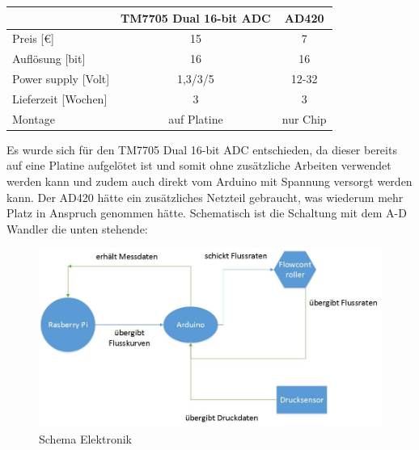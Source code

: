 \begin{center}
\begin{tabular}{l|c|c}
	& TM7705 Dual 16-bit ADC & AD420 \\ 
	\hline Preis [\euro]	& 15  & 7 \\ 
	\hline Auflösung [bit]	& 16  & 16 \\ 
	\hline Power supply [Volt]	& 1,3/3/5  & 12-32 \\ 
	\hline Lieferzeit [Wochen]	& 3  & 3 \\ 
	\hline Montage 	& auf Platine  & nur Chip \\ 
\end{tabular} 	
\end{center}


Es wurde sich für den TM7705 Dual 16-bit ADC entschieden, da dieser bereits auf eine Platine aufgelötet ist und somit ohne zusätzliche Arbeiten verwendet werden kann und zudem auch direkt vom Arduino mit Spannung versorgt werden kann. Der AD420 hätte ein zusätzliches Netzteil gebraucht, was wiederum mehr Platz in Anspruch genommen hätte. Schematisch ist die Schaltung mit dem A-D Wandler die unten stehende:


\begin{figure}[h]
	\begin{center}
		\includegraphics[scale=0.6]{Schema_Elektronik.jpg}
		\caption[Schema Elektronik]{Schema Elektronik}
	\end{center}
\end{figure}


